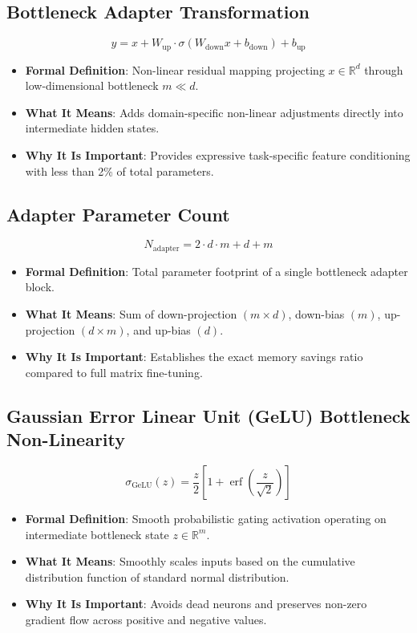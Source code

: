 \documentclass[11pt,a4paper]{article}
\theoremstyle{definition}
\begin{document}
\subsection{Bottleneck Adapter Transformation}
{\boldmath
\begin{equation}
y = x + W_{\text{up}} \cdot \sigma(W_{\text{down}} x + b_{\text{down}}) + b_{\text{up}}
\end{equation}
}
\begin{itemize}
    \item \textbf{Formal Definition}: Non-linear residual mapping projecting $x \in \mathbb{R}^d$ through low-dimensional bottleneck $m \ll d$.
    \item \textbf{What It Means}: Adds domain-specific non-linear adjustments directly into intermediate hidden states.
    \item \textbf{Why It Is Important}: Provides expressive task-specific feature conditioning with less than 2\% of total parameters.
\end{itemize}

\subsection{Adapter Parameter Count}
{\boldmath
\begin{equation}
N_{\text{adapter}} = 2 \cdot d \cdot m + d + m
\end{equation}
}
\begin{itemize}
    \item \textbf{Formal Definition}: Total parameter footprint of a single bottleneck adapter block.
    \item \textbf{What It Means}: Sum of down-projection $(m \times d)$, down-bias $(m)$, up-projection $(d \times m)$, and up-bias $(d)$.
    \item \textbf{Why It Is Important}: Establishes the exact memory savings ratio compared to full matrix fine-tuning.
\end{itemize}

\subsection{Gaussian Error Linear Unit (GeLU) Bottleneck Non-Linearity}
{\boldmath
\begin{equation}
\sigma_{\text{GeLU}}(z) = \frac{z}{2} \left[ 1 + \operatorname{erf}\left(\frac{z}{\sqrt{2}}\right) \right]
\end{equation}
}
\begin{itemize}
    \item \textbf{Formal Definition}: Smooth probabilistic gating activation operating on intermediate bottleneck state $z \in \mathbb{R}^m$.
    \item \textbf{What It Means}: Smoothly scales inputs based on the cumulative distribution function of standard normal distribution.
    \item \textbf{Why It Is Important}: Avoids dead neurons and preserves non-zero gradient flow across positive and negative values.
\end{itemize}
\end{document}
